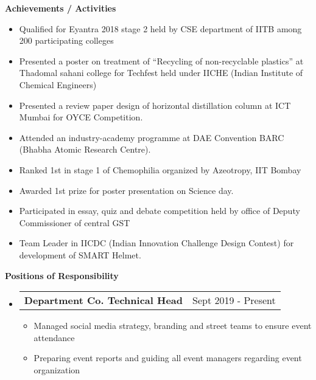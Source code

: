 \documentclass[letterpaper,12pt]{article}[leftmargin=*]
\makeatletter
\def \entryspacing {-0pt}
\renewcommand{\section}[2]{\vspace{5pt}
  \colorbox{secondary}{\color{white}\raggedbottom\normalsize\textbf{{#1}{\hspace{7pt}#2}}}
}
\newcommand{\resumeEntryStart}{\begin{itemize}[leftmargin=2.5mm]}
\newcommand{\resumeEntryEnd}{\end{itemize}\vspace{\entryspacing}}
\newcommand{\resumeItemListStart}{\begin{itemize}[leftmargin=4.5mm]}
\newcommand{\resumeItemListEnd}{\end{itemize}}
\newcommand{\resumeItem}[1]{
  \item\small{
    {#1 \vspace{-2pt}}
  }
}
\newcommand{\resumeEntryTD}[2]{
  \vspace{-1pt}\item[]
    \begin{tabular*}{0.97\textwidth}{l@{\extracolsep{\fill}}r}
      \textbf{\color{primary}#1} & {\firabook\color{accent}\small#2} \\
    \end{tabular*}\vspace{-6pt}
}
\makeatother
\begin{document}
  

\section{\faFlag}{Achievements / Activities}
\resumeEntryStart
  \resumeItem {Qualified for Eyantra 2018 stage 2 held by CSE department of IITB among 200 participating colleges}
  \vspace{-4pt}

  \resumeItem {Presented a poster on treatment of “Recycling of non-recyclable plastics” at Thadomal sahani college for Techfest held under IICHE (Indian Institute of Chemical Engineers)}
  \vspace{-4pt}

  \resumeItem {Presented a review paper design of  horizontal distillation column at ICT Mumbai for OYCE Competition. }
  \vspace{-4pt}

  \resumeItem {Attended an industry-academy programme at DAE Convention BARC (Bhabha Atomic Research Centre).}
  \vspace{-4pt}

  \resumeItem {Ranked 1st in stage 1 of Chemophilia organized by Azeotropy, IIT Bombay}
  \vspace{-4pt}

  \resumeItem {Awarded 1st prize for poster presentation on Science day.}
  \vspace{-4pt}

  \resumeItem {Participated in essay, quiz and debate competition held by office of Deputy Commissioner of central GST}
  \vspace{-4pt}

  \resumeItem {Team Leader in IICDC (Indian Innovation Challenge Design Contest) for development of SMART Helmet.}
  \vspace{-4pt}
 
  \resumeEntryEnd
  
  
\section{\faPieChart}{Positions of Responsibility}
  \vspace{3pt}
 
  \resumeEntryStart
      \resumeEntryTD
      {Department Co. Technical Head}{Sept 2019 - Present}
    \resumeItemListStart
      \resumeItem {Managed social media strategy, branding and street teams to ensure event attendance}
      \resumeItem {Preparing event reports and guiding all event managers regarding event organization}
    \resumeItemListEnd
  \resumeEntryEnd
\end{document}
